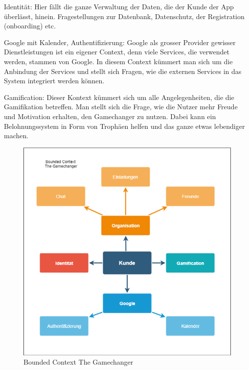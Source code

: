 Identität:
Hier fällt die ganze Verwaltung der Daten, die der Kunde der App überlässt, hinein. Fragestellungen zur Datenbank, Datenschutz, der Registration (onboarding) etc.

Google mit Kalender, Authentifizierung:
Google als grosser Provider gewisser Dienstleistungen ist ein eigener Context, denn viele Services, die verwendet werden, stammen von Google. In diesem Context kümmert man sich um die Anbindung der Services und stellt sich Fragen, wie die externen Services in das System integriert werden können.

Gamification:
Dieser Kontext kümmert sich um alle Angelegenheiten, die die Gamifikation betreffen. Man stellt sich die Frage, wie die Nutzer mehr Freude und Motivation erhalten, den Gamechanger zu nutzen. Dabei kann ein Belohnungssystem in Form von Trophäen helfen und das ganze etwas lebendiger machen. 

\begin{figure}[H]
    \centering
    \includegraphics[width=\textwidth]{images/boundedcontext.png}
    \caption{Bounded Context The Gamechanger}
    \label{fig:boundedcontext}
\end{figure}

